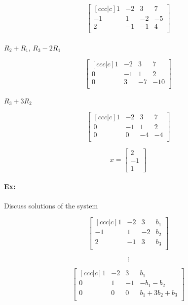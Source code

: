 \documentclass{article}
\begin{document}
\[
\begin{bmatrix}[ccc|c]
    1& -2 & 3 & 7\\
    -1 & 1 & -2 & -5\\
    2 & -1 & -1 & 4\\
\end{bmatrix}
\]
\paragraph{}$R_2 + R_1$, $R_3 - 2R_1$

\[
\begin{bmatrix}[ccc|c]
    1& -2 & 3 & 7\\
    0 & -1 & 1 & 2\\
    0 & 3 & -7 & -10\\
\end{bmatrix}
\]
\paragraph{}$R_3 + 3R_2$

\[
\begin{bmatrix}[ccc|c]
    1& -2 & 3 & 7\\
    0 & -1 & 1 & 2\\
    0 & 0 & -4 & -4\\
\end{bmatrix}
\]


\[
    x = \begin{bmatrix}
        2\\-1\\1
    \end{bmatrix}
\]
\paragraph{Ex:}Discuss solutions of the system

\[
\begin{bmatrix}[ccc|c]
    1& -2 & 3 & b_1\\
    -1 & 1 & -2 & b_2\\
    2 & -1 & 3 & b_3\\
\end{bmatrix}
\]

\[
\vdots
\]
    
\[
\begin{bmatrix}[ccc|c]
    1& -2 & 3 & b_1\\
    0 & 1 & -1 & -b_1-b_2\\
    0 & 0 & 0 & b_1+3b_2+b_3\\
\end{bmatrix}
\]
\end{document}
